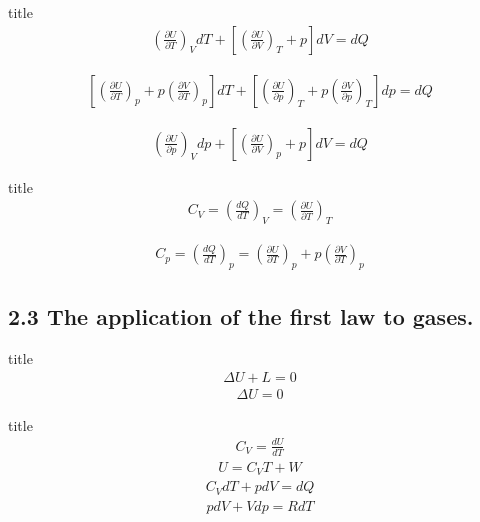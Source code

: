 \documentclass[dvipdfmx, 10pt, aspectratio = 169]{beamer}
\begin{document}
\begin{frame}{title}
	\begin{align}
		\left(\frac{\partial U}{\partial T}\right)_V dT + \left[ \left( \frac{\partial U}{\partial V} \right)_T + p \right] dV = dQ
	\end{align}
	
	\begin{align}
		\left[ \left( \frac{\partial U}{\partial T} \right)_p + p \left( \frac{\partial V}{\partial T} \right)_p \right] dT + \left[ \left( \frac{\partial U}{\partial p} \right)_T + p\left( \frac{\partial V}{\partial p} \right)_T \right] dp = dQ
	\end{align}
	
	\begin{align}
		\left( \frac{\partial U}{\partial p} \right)_V dp + \left[ \left( \frac{\partial U}{\partial V} \right)_p + p \right]dV = dQ
	\end{align}
\end{frame}

\begin{frame}{title}
	\begin{align}
		C_V = \left( \frac{dQ}{dT} \right)_V = \left( \frac{\partial U}{\partial T} \right)_T
	\end{align}
	
	\begin{align}
		C_p = \left( \frac{dQ}{dT} \right)_p = \left( \frac{\partial U}{\partial T} \right)_p + p \left( \frac{\partial V}{\partial T} \right)_p
	\end{align}
\end{frame}

\subsection{2.3 The application of the first law to gases.}

\begin{frame}{title}
	\begin{align*}
		\Delta U + L = 0
	\end{align*}
	\begin{align*}
		\Delta U  = 0
	\end{align*}
\end{frame}


\begin{frame}{title}
	\begin{align}
		C_V = \frac{d U}{dT}
	\end{align}
	\begin{align}
		U = C_V T + W
	\end{align}
	\begin{align}
		C_V dT + pdV = dQ
	\end{align}
	\begin{align}
		pdV + Vdp = RdT
	\end{align}
\end{frame}
\end{document}
